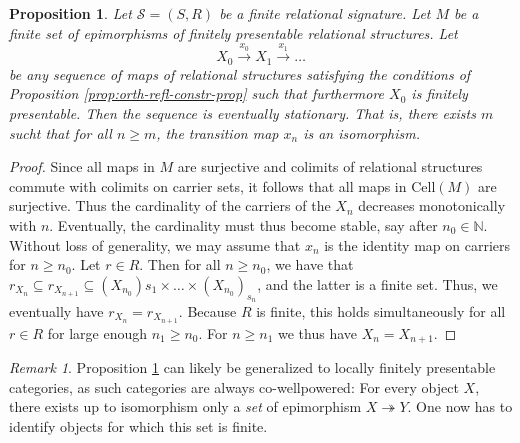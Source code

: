 \documentclass[a4paper]{article}
\newtheorem{proposition}[theorem]{Proposition}
\theoremstyle{remark}
\newtheorem{remark}[theorem]{Remark}
\theoremstyle{definition}
\begin{document}
\begin{proposition}
  \label{prop:surjective-orthogonal-reflection}
  Let $\mathcal{S} = (S, R)$ be a finite relational signature.
  Let $M$ be a finite set of epimorphisms of finitely presentable relational structures.
  Let
  \begin{equation}
    X_0 \xrightarrow{x_0} X_1 \xrightarrow{x_1} \dots
  \end{equation}
  be any sequence of maps of relational structures satisfying the conditions of Proposition \ref{prop:orth-refl-constr-prop} such that furthermore $X_0$ is finitely presentable.
  Then the sequence is eventually stationary.
  That is, there exists $m$ sucht that for all $n \geq m$, the transition map $x_n$ is an isomorphism.
\end{proposition}
\begin{proof}
  Since all maps in $M$ are surjective and colimits of relational structures commute with colimits on carrier sets, it follows that all maps in $\mathrm{Cell}(M)$ are surjective.
  Thus the cardinality of the carriers of the $X_n$ decreases monotonically with $n$.
  Eventually, the cardinality must thus become stable, say after $n_0 \in \mathbb{N}$.
  Without loss of generality, we may assume that $x_n$ is the identity map on carriers for $n \geq n_0$.
  Let $r \in R$.
  Then for all $n \geq n_0$, we have that $r_{X_n} \subseteq r_{X_{n + 1}} \subseteq (X_{n_0}){s_1} \times \dots \times (X_{n_0})_{s_n}$, and the latter is a finite set.
  Thus, we eventually have $r_{X_n} = r_{X_{n + 1}}$.
  Because $R$ is finite, this holds simultaneously for all $r \in R$ for large enough $n_1 \geq n_0$.
  For $n \geq n_1$ we thus have $X_n = X_{n + 1}$.
\end{proof}

\begin{remark}
  Proposition \ref{prop:surjective-orthogonal-reflection} can likely be generalized to locally finitely presentable categories, as such categories are always co-wellpowered:
  For every object $X$, there exists up to isomorphism only a \emph{set} of epimorphism $X \twoheadrightarrow Y$.
  One now has to identify objects for which this set is finite.
\end{remark}
\end{document}
